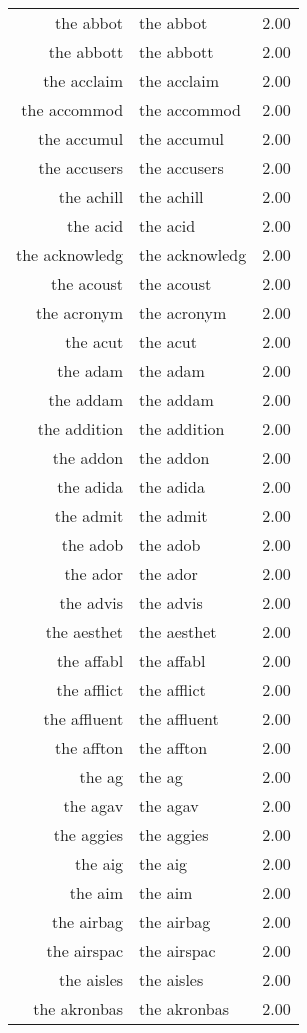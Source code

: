 \begin{table}[ht]
\begin{tabular}{rlr}
  the abbot & the abbot & 2.00 \\ 
  the abbott & the abbott & 2.00 \\ 
  the acclaim & the acclaim & 2.00 \\ 
  the accommod & the accommod & 2.00 \\ 
  the accumul & the accumul & 2.00 \\ 
  the accusers & the accusers & 2.00 \\ 
  the achill & the achill & 2.00 \\ 
  the acid & the acid & 2.00 \\ 
  the acknowledg & the acknowledg & 2.00 \\ 
  the acoust & the acoust & 2.00 \\ 
  the acronym & the acronym & 2.00 \\ 
  the acut & the acut & 2.00 \\ 
  the adam & the adam & 2.00 \\ 
  the addam & the addam & 2.00 \\ 
  the addition & the addition & 2.00 \\ 
  the addon & the addon & 2.00 \\ 
  the adida & the adida & 2.00 \\ 
  the admit & the admit & 2.00 \\ 
  the adob & the adob & 2.00 \\ 
  the ador & the ador & 2.00 \\ 
  the advis & the advis & 2.00 \\ 
  the aesthet & the aesthet & 2.00 \\ 
  the affabl & the affabl & 2.00 \\ 
  the afflict & the afflict & 2.00 \\ 
  the affluent & the affluent & 2.00 \\ 
  the affton & the affton & 2.00 \\ 
  the ag & the ag & 2.00 \\ 
  the agav & the agav & 2.00 \\ 
  the aggies & the aggies & 2.00 \\ 
  the aig & the aig & 2.00 \\ 
  the aim & the aim & 2.00 \\ 
  the airbag & the airbag & 2.00 \\ 
  the airspac & the airspac & 2.00 \\ 
  the aisles & the aisles & 2.00 \\ 
  the akronbas & the akronbas & 2.00 \\ 

\end{tabular}
\end{table}
